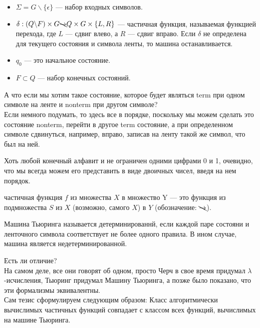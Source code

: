 \begin{Def}
\begin{itemize}
        \item $\Sigma = G \backslash \{\epsilon\}$ --- набор входных символов.
        \item $\delta : (Q \backslash F) \times G \bcancel{\rightarrow}
        Q \times G \times \{L, R\}$ --- частичная функция, называемая функцией перехода, где $L$ --- сдвиг влево, а $R$ --- сдвиг вправо. Если $\delta$ не определена для текущего состояния и символа ленты, то машина останавливается.
        \item $q_0$ --- это начальное состояние.
        \item $F \subset {Q}$  --- набор конечных состояний.
        \end{itemize}
    \end{Def}
    
    \begin{Rem}
        А что если мы хотим такое состояние, которое будет являться term при одном символе на ленте и nonterm при другом символе?\\
        Если немного подумать, то здесь все в порядке, поскольку мы можем сделать это состояние nonterm, перейти в другое term состояние, а при определенном символе сдвинуться, например, вправо, записав на ленту такой же символ, что был на ней.
    \end{Rem}
    
    \begin{Rem}
        Хоть любой конечный алфавит и не ограничен одними цифрами 0 и 1, очевидно, что мы всегда можем его представить в виде двоичных чисел, введя на нем порядок.
    \end{Rem}
    
    \begin{Def}
        частичная функция $f$ из множества $X$ в множество Y --- это функция из подмножества $S$ из $X$ (возможно, самого $X$) в $Y$ (обозначение: $\bcancel{\rightarrow}$). 
    \end{Def}
    
    \begin{Def}
        Машина Тьюринга называется детерминированнй, если каждой паре состояни и ленточного символа соответствует не более одного правила. В ином случае, машина является недетерминированной.
    \end{Def}
    
    \begin{Def}
        Есть ли отличие?\\
        На самом деле, все они говорят об одном, просто Черч в свое время придумал $\lambda$-исчисления, Тьюринг придумал Машину Тьюринга, а позже было показано, что эти формализмы эквивалентны.\\
        Сам тезис сформулируем следующим образом: Класс алгоритмически вычислимых частичных функций совпадает с классом всех функций, вычислимых на машине Тьюринга.
    \end{Def}
    
